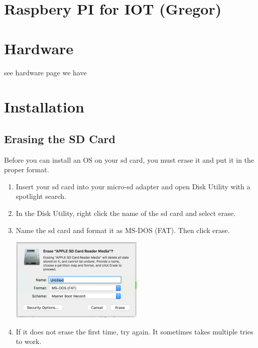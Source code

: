 

\label{raspberry-pi-3}

\FILENAME

\section{Raspbery PI for IOT
(Gregor)}\label{raspbery-pi-for-iot-gregor}

\section{Hardware}\label{hardware}

see hardware page we have

\section{Installation}\label{installation}

\subsection{Erasing the SD Card}\label{erasing-the-sd-card}

Before you can install an OS on your sd card, you must erase it and put
it in the proper format.

\begin{enumerate}
\def\labelenumi{\arabic{enumi}.}
\tightlist
\item
  Insert your sd card into your micro-sd adapter and open Disk Utility
  with a spotlight search.
\item
  In the Disk Utility, right click the name of the sd card and select
  erase.
\item
  Name the sd card and format it as MS-DOS (FAT). Then click erase.

  \includegraphics[width=0.5\textwidth]{images/diskutil.png}

\item
  If it does not erase the first time, try again. It sometimes takes
  multiple tries to work.
\end{enumerate}


